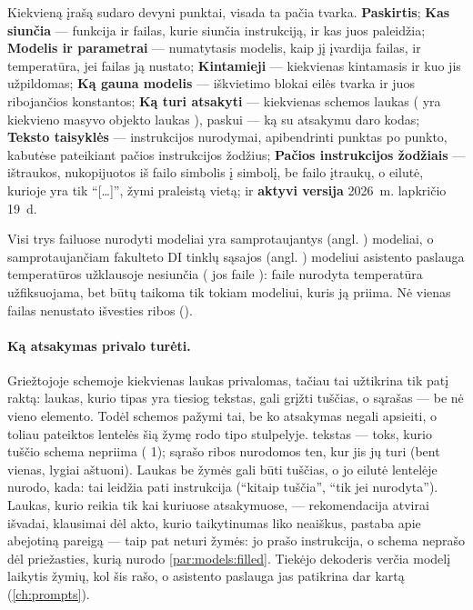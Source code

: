 Kiekvieną įrašą sudaro devyni punktai, visada ta pačia tvarka. \textbf{Paskirtis};
\textbf{Kas siunčia} --- funkcija ir failas, kurie siunčia instrukciją, ir kas juos paleidžia;
\textbf{Modelis ir parametrai} --- numatytasis modelis, kaip jį įvardija failas, ir temperatūra,
jei failas ją nustato; \textbf{Kintamieji} --- kiekvienas kintamasis ir kuo jis užpildomas;
\textbf{Ką gauna modelis} --- iškvietimo blokai eilės tvarka ir juos ribojančios konstantos;
\textbf{Ką turi atsakyti} --- kiekvienas schemos laukas ( yra kiekvieno
masyvo  objekto laukas ), paskui --- ką su atsakymu daro kodas;
\textbf{Teksto taisyklės} --- instrukcijos nurodymai, apibendrinti punktas po punkto, kabutėse
pateikiant pačios instrukcijos žodžius; \textbf{Pačios instrukcijos žodžiais} --- ištraukos,
nukopijuotos iš failo simbolis į simbolį, be failo įtraukų, o eilutė, kurioje yra tik
\enquote{[…]}, žymi praleistą vietą; ir \textbf{aktyvi versija} 2026~m. lapkričio 19~d.

Visi trys failuose nurodyti modeliai yra samprotaujantys (angl. ) modeliai, o
samprotaujančiam fakulteto DI tinklų sąsajos (angl. ) modeliui asistento paslauga
temperatūros užklausoje nesiunčia ( jos faile
): faile nurodyta temperatūra užfiksuojama, bet būtų taikoma tik tokiam
modeliui, kuris ją priima. Nė vienas failas nenustato išvesties ribos ().

\paragraph{Ką atsakymas privalo turėti.} Griežtojoje schemoje kiekvienas laukas privalomas,
tačiau tai užtikrina tik patį raktą: laukas, kurio tipas yra tiesiog tekstas, gali grįžti
tuščias, o sąrašas --- be nė vieno elemento. Todėl schemos pažymi tai, be ko atsakymas negali
apsieiti, o toliau pateiktos lentelės šią žymę rodo tipo stulpelyje.  tekstas
--- toks, kurio tuščio schema nepriima ( 1); sąrašo ribos nurodomos ten, kur
jis jų turi (bent vienas, lygiai aštuoni). Laukas be žymės gali būti tuščias, o jo eilutė
lentelėje nurodo, kada: tai leidžia pati instrukcija (\enquote{kitaip tuščia}, \enquote{tik
jei nurodyta}). Laukas, kurio reikia tik kai kuriuose atsakymuose, --- rekomendacija atvirai
išvadai, klausimai dėl akto, kurio taikytinumas liko neaiškus, pastaba apie abejotiną pareigą
--- taip pat neturi žymės: jo prašo instrukcija, o schema neprašo dėl priežasties, kurią
nurodo \cref{par:models:filled}. Tiekėjo dekoderis verčia modelį laikytis žymių, kol šis
rašo, o asistento paslauga jas patikrina dar kartą (\cref{ch:prompts}).

